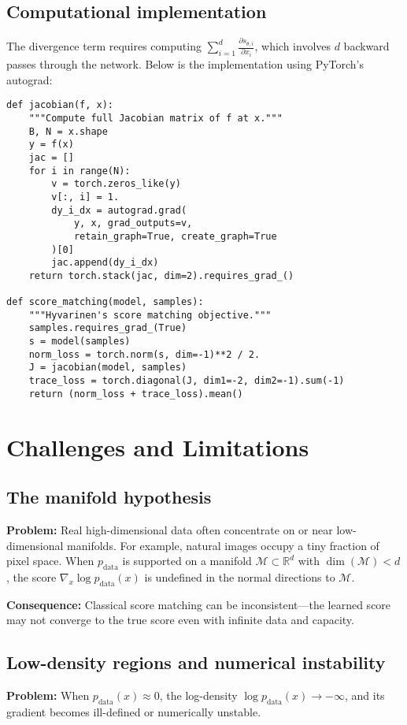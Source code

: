 \documentclass[11pt]{article}
\theoremstyle{definition}
\begin{document}
\subsection{Computational implementation}
The divergence term requires computing $\sum_{i=1}^d \frac{\partial s_{\theta,i}}{\partial x_i}$, 
which involves $d$ backward passes through the network. 
Below is the implementation using PyTorch's autograd:

\begin{lstlisting}[style=py,caption={Exact score matching with Jacobian computation}]
def jacobian(f, x):
    """Compute full Jacobian matrix of f at x."""
    B, N = x.shape
    y = f(x)
    jac = []
    for i in range(N):
        v = torch.zeros_like(y)
        v[:, i] = 1.
        dy_i_dx = autograd.grad(
            y, x, grad_outputs=v,
            retain_graph=True, create_graph=True
        )[0]
        jac.append(dy_i_dx)
    return torch.stack(jac, dim=2).requires_grad_()

def score_matching(model, samples):
    """Hyvarinen's score matching objective."""
    samples.requires_grad_(True)
    s = model(samples)
    norm_loss = torch.norm(s, dim=-1)**2 / 2.
    J = jacobian(model, samples)
    trace_loss = torch.diagonal(J, dim1=-2, dim2=-1).sum(-1)
    return (norm_loss + trace_loss).mean()
\end{lstlisting}

\section{Challenges and Limitations}

\subsection{The manifold hypothesis}
\textbf{Problem:} Real high-dimensional data often concentrate on or near low-dimensional manifolds. 
For example, natural images occupy a tiny fraction of pixel space. 
When $p_{\text{data}}$ is supported on a manifold $\mathcal{M} \subset \mathbb{R}^d$ with $\dim(\mathcal{M}) < d$, 
the score $\nabla_x \log p_{\text{data}}(x)$ is undefined in the normal directions to $\mathcal{M}$.

\textbf{Consequence:} Classical score matching can be inconsistent—the learned score may not converge to the true score even with infinite data and capacity.

\subsection{Low-density regions and numerical instability}
\textbf{Problem:} When $p_{\text{data}}(x) \approx 0$, the log-density $\log p_{\text{data}}(x) \to -\infty$, 
and its gradient becomes ill-defined or numerically unstable.
\end{document}
